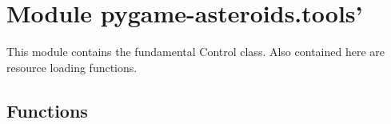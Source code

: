 %
%
%


\section{Module pygame-asteroids.tools'}

    \label{pygame-asteroids:tools'}
This module contains the fundamental Control class. Also contained here are
resource loading functions.



  \subsection{Functions}

    \label{pygame-asteroids:tools:cursor_from_image}

    \vspace{0.5ex}

